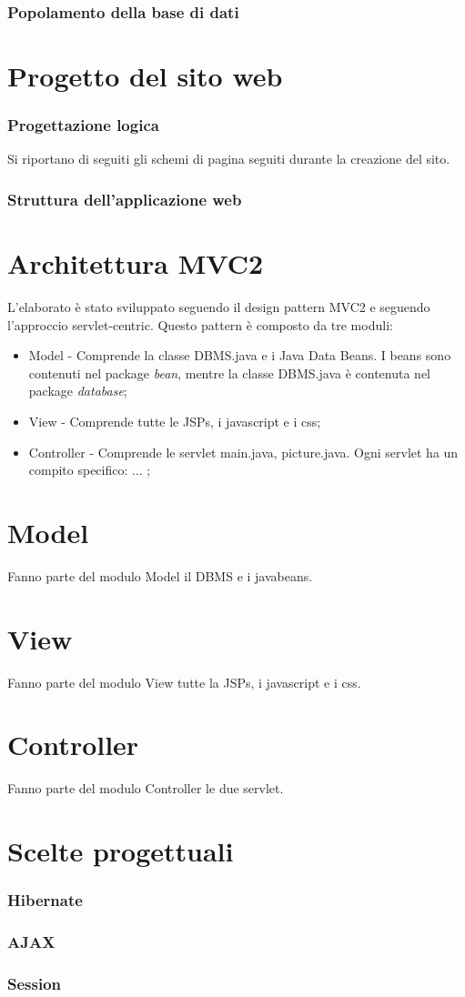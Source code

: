 \documentclass[a4paper,10pt]{report}
\begin{document}
\section{Popolamento della base di dati}



\part{Progetto del sito web}

\section{Progettazione logica}

Si riportano di seguiti gli schemi di pagina seguiti durante la creazione del sito.

\section{Struttura dell'applicazione web}

\part{Architettura MVC2}
L'elaborato \`e stato sviluppato seguendo il design pattern MVC2 e seguendo l'approccio servlet-centric. Questo pattern \`e composto da tre moduli:

\begin{itemize}
 \item Model - Comprende la classe DBMS.java e i Java Data Beans. I beans sono contenuti nel package \textit{bean}, mentre la classe DBMS.java \`e contenuta nel package \textit{database};
 \item View - Comprende tutte le JSPs, i javascript e i css;
 \item Controller - Comprende le servlet main.java, picture.java.  Ogni servlet ha un compito specifico: ... ;
\end{itemize}

\part{Model}
Fanno parte del modulo Model il DBMS e i javabeans.
\part{View}
Fanno parte del modulo View tutte la JSPs, i javascript e i css.
\part{Controller}
Fanno parte del modulo Controller le due servlet.



\part{Scelte progettuali}

\section{Hibernate}
\section{AJAX}
\section{Session}
\end{document}
